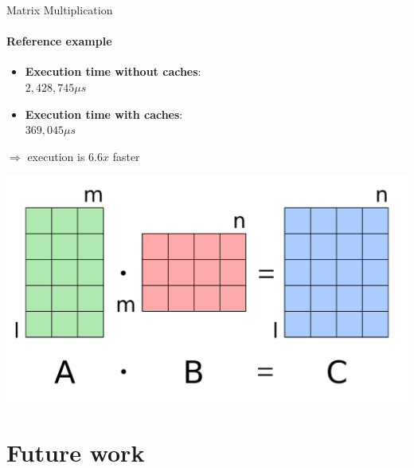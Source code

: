 \documentclass[handout,aspectratio=169]{beamer}
\begin{document}
\begin{frame}{Matrix Multiplication}
	\framesubtitle{Reference example}
	\begin{minipage}{.77\textwidth}
		\begin{itemize}
			\item \textbf{Execution time without caches}:\\ $2,428,745 \mu s$
			\item \textbf{Execution time with caches}:\\ $369,045 \mu s$
		\end{itemize}
		\begin{center}
			$\Rightarrow$ execution is $6.6x$ faster
		\end{center}
	\end{minipage}
	\begin{minipage}{.22\textwidth}
		\begin{center}
			\includegraphics[width=.9\textwidth]{matmul.png}
		\end{center}
	\end{minipage}
\end{frame}

\section{Future work}
\end{document}
